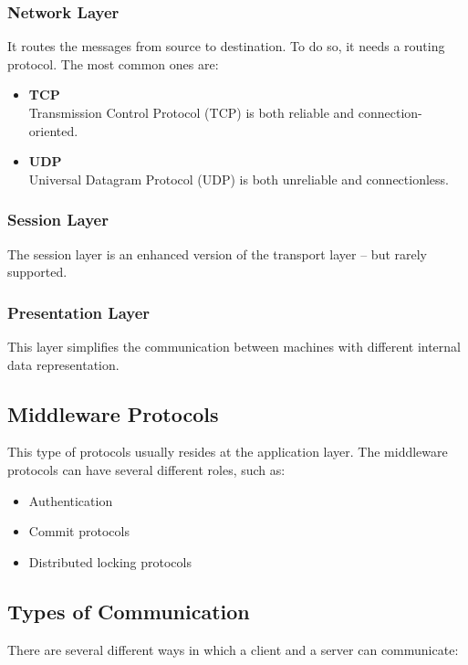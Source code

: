 \documentclass{article}
\begin{document}
\subsubsection{Network Layer}
It routes the messages from source to destination. To do so, it needs a routing protocol. The most common ones are:

\begin{itemize}
	\item \textbf{TCP} \\
	Transmission Control Protocol (TCP) is both reliable and connection-oriented.
	
	\item \textbf{UDP} \\
	Universal Datagram Protocol (UDP) is both unreliable and connectionless.
\end{itemize}

\subsubsection{Session Layer}
The session layer is an enhanced version of the transport layer -- but rarely supported.

\subsubsection{Presentation Layer}
This layer simplifies the communication between machines with different internal data representation.

\subsection{Middleware Protocols}
This type of protocols usually resides at the application layer. The middleware protocols can have several different roles, such as:

\begin{itemize}
	\item Authentication
	\item Commit protocols
	\item Distributed locking protocols
\end{itemize}

\subsection{Types of Communication}
There are several different ways in which a client and a server can communicate:
\end{document}
